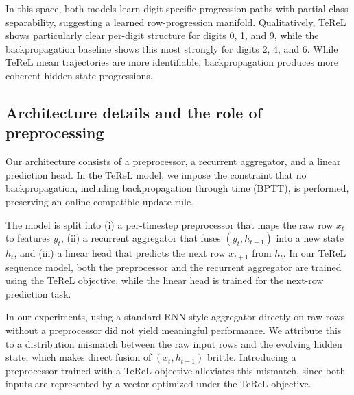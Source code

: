 \noindent In this space, both models learn digit-specific progression paths with partial class separability, suggesting a learned row-progression manifold. Qualitatively, TeReL shows particularly clear per-digit structure for digits 0, 1, and 9, while the backpropagation baseline shows this most strongly for digits 2, 4, and 6. While TeReL mean trajectories are more identifiable, backpropagation produces more coherent hidden-state progressions.

\subsection{Architecture details and the role of preprocessing}
Our architecture consists of a preprocessor, a recurrent aggregator, and a linear prediction head. In the TeReL model, we impose the constraint that no backpropagation, including backpropagation through time (BPTT), is performed, preserving an online-compatible update rule.

The model is split into (i) a per-timestep preprocessor that maps the raw row $x_t$ to features $y_t$, (ii) a recurrent aggregator that fuses $(y_t, h_{t-1})$ into a new state $h_t$, and (iii) a linear head that predicts the next row $x_{t+1}$ from $h_t$. In our TeReL sequence model, both the preprocessor and the recurrent aggregator are trained using the TeReL objective, while the linear head is trained for the next-row prediction task.

In our experiments, using a standard RNN-style aggregator directly on raw rows without a preprocessor did not yield meaningful performance. We attribute this to a distribution mismatch between the raw input rows and the evolving hidden state, which makes direct fusion of $(x_t, h_{t-1})$ brittle. Introducing a preprocessor trained with a TeReL objective alleviates this mismatch, since both inputs are represented by a vector optimized under the TeReL-objective.
